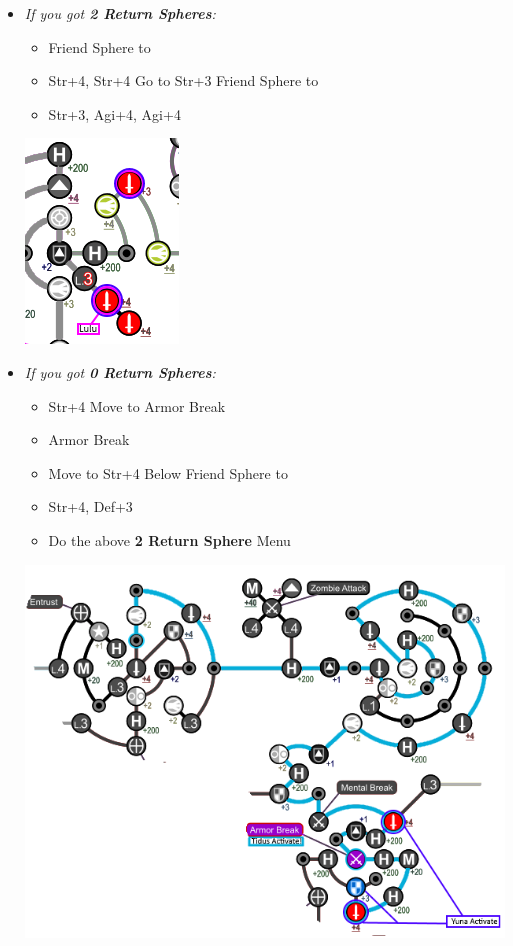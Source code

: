 \begin{spheregrid}
\begin{multicols}{2}
\begin{itemize}
\begin{itemize}
              \columnbreak
        \item \textit{If you got \textbf{2 Return Spheres}:}
              \begin{itemize}
                \item Friend Sphere to \lulu
                \item Str+4, Str+4
                      \luluf Go to Str+3
                      \yunaf Friend Sphere to \lulu
                \item Str+3, Agi+4, Agi+4
              \end{itemize}
              \includegraphics[width=.4\columnwidth]{graphics/2_and_2}
        \item \textit{If you got \textbf{0 Return Spheres}:}
              \begin{itemize}
                \tidusf Move to Str+4 by Armor Break
                \yunaf Friend Sphere to \tidus
                \item Str+4
                      \tidusf Move to Armor Break
                \item Armor Break
                \item Move to Str+4 Below
                      \yunaf Friend Sphere to \tidus
                \item Str+4, Def+3
                \item Do the above \textbf{2 Return Sphere} Menu
              \end{itemize}
              \includegraphics[width=.9\columnwidth]{graphics/0_returns}

\end{itemize}
\end{itemize}
\end{multicols}
\end{spheregrid}
